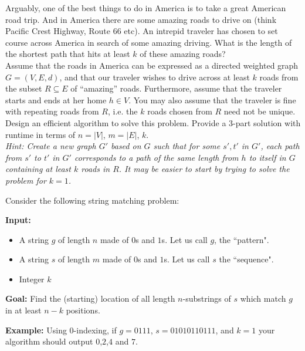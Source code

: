 \documentclass{article}
\begin{document}

Arguably, one of the best things to do in America is to take a great
American road trip. And in America there are some amazing roads to
drive on (think Pacific Crest Highway, Route 66 etc). An intrepid
traveler has chosen to set course across America in search of some
amazing driving. What is the length of the shortest path that hits at
least $k$ of these amazing roads? \\

Assume that the roads in America can be expressed as a directed
weighted graph $G = (V,E, d)$, and that our traveler wishes to drive
across at least $k$ roads from the subset $R \subseteq E$ of ``amazing''
roads. Furthermore, assume that the traveler starts and ends at her
home $h \in V$. You may also assume that the traveler is fine with
repeating roads from $R$, i.e. the $k$ roads chosen from $R$ need not
be unique. \\

Design an efficient algorithm to solve this problem. 
Provide a 3-part solution with runtime in terms of $n = |V|$, $m =
|E|$, $k$. \\

\emph{Hint: Create a new graph $G'$ based on $G$ such that for some $s', t'$ in $G'$, each path from $s'$ to $t'$ in $G'$ corresponds to a path of the same length from $h$ to itself in $G$ containing at least $k$ roads in $R$. It may be easier to start by trying to solve the problem for $k = 1$.}


Consider the following string matching problem:

\noindent\textbf{Input:}  
    \begin{itemize}
        \item A string $g$ of length $n$ made of $0$s and $1$s.  Let us call $g$, the ``pattern".
        \item A string $s$ of length $m$ made of $0$s and $1$s.  Let us call $s$ the ``sequence".
        \item Integer $k$
    \end{itemize}
\noindent\textbf{Goal:}  Find the (starting) location of all length $n$-substrings of $s$ which match $g$ in at least $n-k$ positions. 

\noindent \textbf{Example:} Using $0$-indexing, if $g = 0111$, $s = 01010110111$, and $k = 1$ your algorithm should output $0$,$2$,$4$ and $7$.
\end{document}
